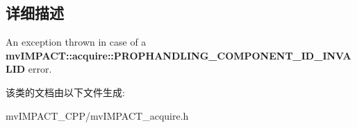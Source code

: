 \subsection{详细描述}
An exception thrown in case of a {\bfseries mv\+I\+M\+P\+A\+C\+T\+::acquire\+::\+P\+R\+O\+P\+H\+A\+N\+D\+L\+I\+N\+G\+\_\+\+C\+O\+M\+P\+O\+N\+E\+N\+T\+\_\+\+I\+D\+\_\+\+I\+N\+V\+A\+L\+I\+D} error. 

该类的文档由以下文件生成\+:\begin{DoxyCompactItemize}
\item 
mv\+I\+M\+P\+A\+C\+T\+\_\+\+C\+P\+P/mv\+I\+M\+P\+A\+C\+T\+\_\+acquire.\+h\end{DoxyCompactItemize}
